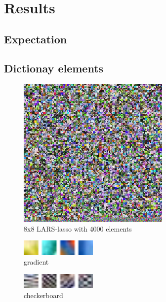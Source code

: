 \chapter{Results}
\thispagestyle{empty}

\section{Expectation}

\section{Dictionay elements}
\begin{figure}
\centering
\includegraphics[width = 0.66\textwidth]{images/8_4000_10000_10_lasso.png} 
\caption{8x8 LARS-lasso with 4000 elements}
\label{fig:8_4000_lasso}
\end{figure}

\begin{figure}
\centering
\includegraphics[width = 0.33\textwidth]{images/gradient.png} 
\caption{gradient}
\label{fig:gradient}
\end{figure}

\begin{figure}
\centering
\includegraphics[width = 0.33\textwidth]{images/checkerboard.png}
\caption{checkerboard}
\label{fig:checkerboard}
\end{figure}


